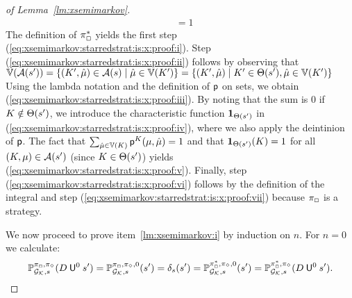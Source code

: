 \begin{proof}[of Lemma~\ref{lm:xsemimarkov}]
\begin{align}
    & = 1
    \label{eq:xsemimarkov:starredstrat:is:x:proof:vii}
  \end{align}
  The definition of $\pi^*_{\Box}$ yields the first step
  (\ref{eq:xsemimarkov:starredstrat:is:x:proof:i}).
  Step (\ref{eq:xsemimarkov:starredstrat:is:x:proof:ii}) follows by
  observing that
  $\mathbb{V}(\mathcal{A}(s')) =
  \{(K',\hat{\mu})\in\mathcal{A}(s)\mid\hat{\mu}\in\mathbb{V}(K')\} =
  \{(K',\hat{\mu})\mid K'\in\Theta(s'), \hat{\mu}\in\mathbb{V}(K')\}$
  Using the lambda notation and the definition of $\mathsf{p}$ on sets, we
  obtain (\ref{eq:xsemimarkov:starredstrat:is:x:proof:iii}).
  By noting that the sum is 0 if $K\notin \Theta(s')$, we introduce
  the characteristic function $\mathbf{1}_{\Theta(s')}$ in
  (\ref{eq:xsemimarkov:starredstrat:is:x:proof:iv}), where we also
  apply the deintinion of $\mathsf{p}$.
  The fact that
  $\sum_{\hat{\mu}\in\mathbb{V}(K)}\mathsf{p}^K(\mu,\hat{\mu})=1$ and that
  $\mathbf{1}_{\Theta(s')}(K)=1$ for all $(K,\mu)\in\mathcal{A}(s')$
  (since $K\in\Theta(s')$) yields
  (\ref{eq:xsemimarkov:starredstrat:is:x:proof:v}).
  Finally, step (\ref{eq:xsemimarkov:starredstrat:is:x:proof:vi})
  follows by the definition of the integral and step
  (\ref{eq:xsemimarkov:starredstrat:is:x:proof:vii}) because
  $\pi_{\Box}$ is a strategy.

  \medskip

  We now proceed to prove item~\ref{lm:xsemimarkov:i} by induction on
  $n$.  For $n=0$ we calculate:
  \[\mathbb{P}^{\pi_{{\Box}},\pi_{{\Diamond}}}_{{\mathcal{G}_{\mathcal{K}}},s}(D \mathbin{\mathsf{U}}^0 s') =
  \mathbb{P}^{\pi_{{\Box}},\pi_{{\Diamond}},0}_{{\mathcal{G}_{\mathcal{K}}},s}(s') =
  \delta_s(s') =
  \mathbb{P}^{\pi^*_{{\Box}},\pi_{{\Diamond}},0}_{{\mathcal{G}_{\mathcal{K}}},s}(s') =
  \mathbb{P}^{\pi^*_{{\Box}},\pi_{{\Diamond}}}_{{\mathcal{G}_{\mathcal{K}}},s}(D \mathbin{\mathsf{U}}^0 s').\]


\end{proof}
